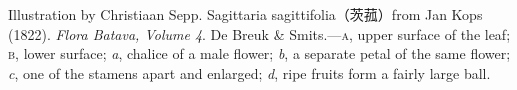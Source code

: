 %
%
%
%
%
%
%
%
%

\null%

\clearpage%

\begingroup%
\footnotesize%
\singlespacing%
\setlength{\parindent}{0pt}%

\null%

\vfill%

\begingroup%
Illustration by Christiaan Sepp. Sagittaria sagittifolia\!（茨菰）\!from Jan
Kops (1822). \textit{Flora Batava, Volume 4}. De Breuk \& Smits.---\textsc{a},
upper surface of the leaf; \textsc{b}, lower surface; \textit{a}, chalice of a
male flower; \textit{b}, a separate petal of the same flower; \textit{c}, one
of the stamens apart and enlarged; \textit{d}, ripe fruits form a fairly large
ball.

\endgroup%

\endgroup%

